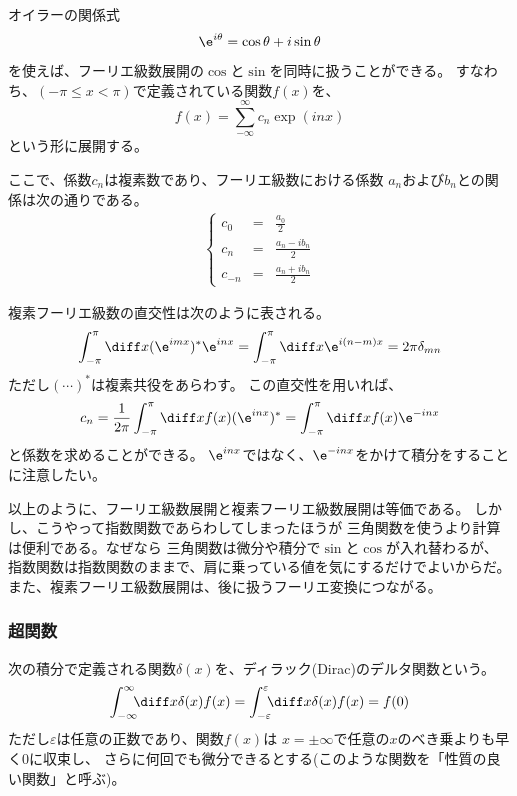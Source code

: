 オイラーの関係式
\begin{equation}
  \e^{i\theta} = \cos \theta + i \sin \theta
\end{equation}
を使えば、フーリエ級数展開の$\cos$と$\sin$を同時に扱うことができる。
すなわち、$(-\pi \le x < \pi)$で定義されている関数$f(x)$を、
$$
  f(x) = \sum_{-\infty}^{\infty} c_n \exp{(inx)}
$$
という形に展開する。

ここで、係数$c_n$は複素数であり、フーリエ級数における係数
$a_n$および$b_n$との関係は次の通りである。
\begin{eqnarray}
  \left\{
  \begin{array}{ccc}
    c_0    & = & \displaystyle\frac{a_0}{2}         \\
    c_n    & = & \displaystyle\frac{a_n - i b_n}{2} \\
    c_{-n} & = & \displaystyle\frac{a_n + i b_n}{2}
  \end{array}
  \right.
  \label{eq_fourier_prefoctor}
\end{eqnarray}

複素フーリエ級数の直交性は次のように表される。
\begin{equation}
  \int_{-\pi}^{\pi} \diff x (\e^{imx})^* \e^{inx} =
  \int_{-\pi}^{\pi} \diff x \e^{i(n-m)x} = 2\pi \delta_{mn}
\end{equation}
ただし$(\cdots)^*$は複素共役をあらわす。
この直交性を用いれば、
\begin{equation}
  c_n = \frac{1}{2\pi} \int_{-\pi}^{\pi} \diff x  f(x) (\e^{inx})^*
  = \int_{-\pi}^{\pi} \diff x  f(x) \e^{-inx}
\end{equation}
と係数を求めることができる。
$\e^{inx}$ではなく、$\e^{-inx}$をかけて積分をすることに注意したい。

以上のように、フーリエ級数展開と複素フーリエ級数展開は等価である。
しかし、こうやって指数関数であらわしてしまったほうが
三角関数を使うより計算は便利である。なぜなら
三角関数は微分や積分で$\sin$と$\cos$が入れ替わるが、
指数関数は指数関数のままで、肩に乗っている値を気にするだけでよいからだ。
また、複素フーリエ級数展開は、後に扱うフーリエ変換につながる。


\subsubsection{超関数}

次の積分で定義される関数$\delta(x)$を、ディラック(Dirac)のデルタ関数という。
$$
  \int_{-\infty}^{\infty} \!\!\! \diff x \delta(x) f(x) =
  \int_{-\varepsilon}^{\varepsilon} \!\!\! \diff x \delta(x) f(x) =
  f(0)
$$
ただし$\varepsilon$は任意の正数であり、関数$f(x)$は
$x = \pm \infty$で任意の$x$のべき乗よりも早く$0$に収束し、
さらに何回でも微分できるとする(このような関数を「性質の良い関数」と呼ぶ)。

